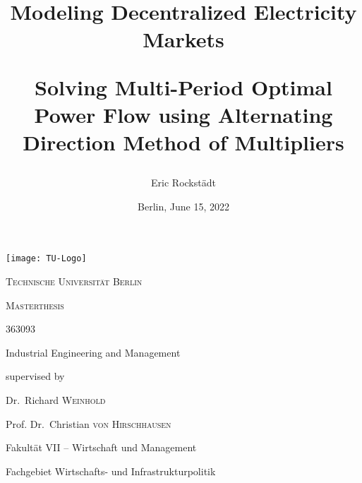 \documentclass[12pt, a4paper, oneside, bibliography=totoc, numbers=noendperiod]{scrartcl}
\title{\Huge\textbf{Modeling Decentralized Electricity Markets}\par\vspace{0.5cm} \Large Solving Multi-Period Optimal Power Flow using Alternating Direction Method of Multipliers}
\author{Eric Rockstädt}
\date{Berlin, June 15, 2022}
\begin{document}
\begin{titlepage}
	\centering
	\texttt{[image: TU-Logo]}\par\vspace{1cm}
	{\scshape\Large Technische Universität Berlin \par}
	\vspace{1cm}
	{\scshape\Huge Masterthesis\par}
	\vspace{1cm}
	{\@title \par}
	\vspace{1cm}
	{\Large \textit{\@author} \par \large 363093 \par Industrial Engineering and Management \par}
	\vspace{1.5cm}
	\large
	supervised by\par
	Dr.~Richard \textsc{Weinhold}\par
	Prof. Dr.~Christian \textsc{von Hirschhausen} \par
	\vspace{0.5cm}
	Fakultät VII – Wirtschaft und Management \par
	Fachgebiet
Wirtschafts- und Infrastrukturpolitik \par
	\vfill
	{\large \@date\par}
\end{titlepage}

\newpage



\newpage


\newpage


\newpage

\tableofcontents
\newpage

\chead{\textit{\listfigurename}} 
\listoffigures
\newpage

\chead{\textit{\listtablename}} 
\listoftables
\newpage

\chead{\textit{\lstlistlistingname}} 
\lstlistoflistings
\newpage


\printnomenclature
\newpage
\end{document}

